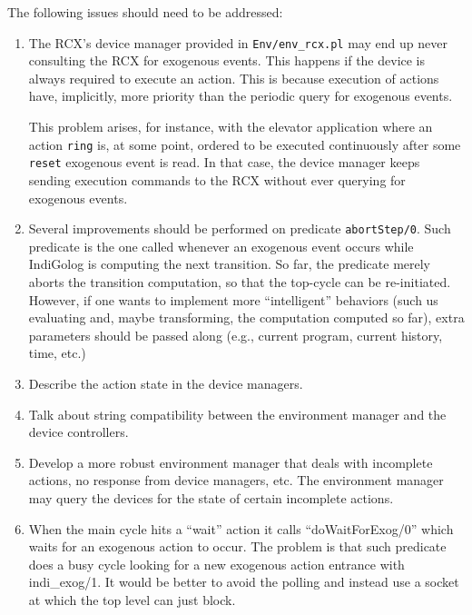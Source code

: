 \documentclass[11pt]{article}
\begin{document}
The following issues should need to be addressed:

\begin{enumerate}
\item The RCX's device manager provided in \texttt{Env/env\_rcx.pl} may end up
  never consulting the RCX for exogenous events. This happens if the device is
  always required to execute an action. This is because execution of actions
  have, implicitly, more priority than the periodic query for exogenous
  events. 
  
  This problem arises, for instance, with the elevator application where an
  action \texttt{ring} is, at some point, ordered to be executed continuously
  after some \texttt{reset} exogenous event is read.  In that case, the device
  manager keeps sending execution commands to the RCX without ever querying
  for exogenous events.
  
\item Several improvements should be performed on predicate
  \texttt{abortStep/0}. Such predicate is the one called whenever an exogenous
  event occurs while IndiGolog is computing the next transition.  So far, the
  predicate merely aborts the transition computation, so that the top-cycle
  can be re-initiated.  However, if one wants to implement more
  ``intelligent'' behaviors (such us evaluating and, maybe transforming, the
  computation computed so far), extra parameters should be passed along (e.g.,
  current program, current history, time, etc.)

\item Describe the action state in the device managers.

\item Talk about string compatibility between the environment manager and the
device controllers.

\item Develop a more robust environment manager that deals with incomplete
  actions, no response from device managers, etc. The environment manager may
  query the devices for the state of certain incomplete actions.
  
\item When the main cycle hits a ``wait'' action it calls ``doWaitForExog/0''
  which waits for an exogenous action to occur. The problem is that such
  predicate does a busy cycle looking for a new exogenous action entrance with
  indi\_exog/1. It would be better to avoid the polling and instead use a
  socket at which the top level can just block.
\end{enumerate}
\end{document}

